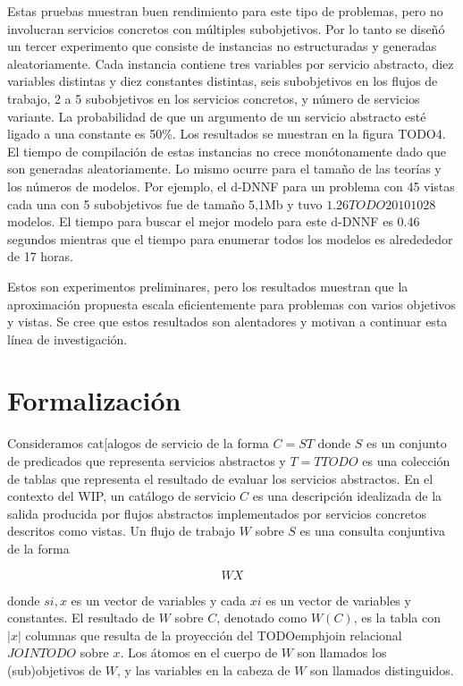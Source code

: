 \documentclass{article}
\begin{document}
Estas pruebas muestran buen rendimiento para este tipo de problemas, pero no
involucran servicios concretos con múltiples subobjetivos. Por lo tanto se
diseñó un tercer experimento que consiste de instancias no estructuradas y
generadas aleatoriamente. Cada instancia contiene tres variables por servicio
abstracto, diez variables distintas y diez constantes distintas, seis
subobjetivos en los flujos de trabajo, 2 a 5 subobjetivos en los servicios
concretos, y número de servicios variante. La probabilidad de que un argumento
de un servicio abstracto esté ligado a una constante es 50\%. Los resultados se
muestran en la figura TODO4. El tiempo de compilación de estas instancias no
crece monótonamente dado que son generadas aleatoriamente. Lo mismo ocurre para
el tamaño de las teorías y los números de modelos. Por ejemplo, el d-DNNF para
un problema con 45 vistas cada una con 5 subobjetivos fue de tamaño 5,1Mb y tuvo
$1.26 TODO 20101028$ modelos. El tiempo para buscar el mejor modelo para este
d-DNNF es 0.46 segundos mientras que el tiempo para enumerar todos los modelos
es alredededor de 17 horas.

Estos son experimentos preliminares, pero los resultados muestran que la
aproximación propuesta escala eficientemente para problemas con varios objetivos
y vistas. Se cree que estos resultados son alentadores y motivan a continuar
esta línea de investigación.

\section{Formalización}

Consideramos cat[alogos de servicio de la forma $C = ST$ donde $S$ es un
conjunto de predicados que representa servicios abstractos y $T=TTODO$ es una
colección de tablas que representa el resultado de evaluar los servicios
abstractos. En el contexto del WIP, un catálogo de servicio $C$ es una
descripción idealizada de la salida producida por flujos abstractos
implementados por servicios concretos descritos como vistas. Un flujo de trabajo
$W$ sobre $S$ es una consulta conjuntiva de la forma

$$
WX
$$

donde $si,x$ es un vector de variables y cada $xi$ es un vector de variables y
constantes. El resultado de $W$ sobre $C$, denotado como $W(C)$, es la tabla con
$|x|$ columnas que resulta de la proyección del TODOemphjoin relacional
$JOINTODO$ sobre $x$. Los átomos en el cuerpo de $W$ son llamados los
(sub)objetivos de $W$, y las variables en la cabeza de $W$ son llamados
distinguidos.
\end{document}
